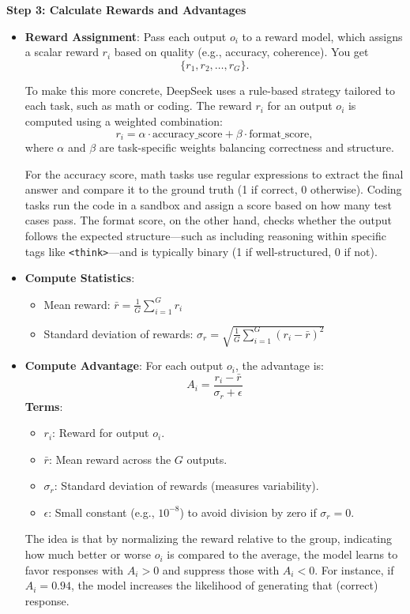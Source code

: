 \documentclass{article}
\begin{document}
\noindent\textbf{Step 3: Calculate Rewards and Advantages}
\begin{itemize}
    \item \textbf{Reward Assignment}: Pass each output \( o_i \) to a reward model, which assigns a scalar reward \( r_i \) based on quality (e.g., accuracy, coherence). You get 
\[
\{r_1, r_2, \dots, r_G\}.
\]


To make this more concrete, DeepSeek uses a rule-based strategy tailored to each task, such as math or coding. The reward \( r_i \) for an output \( o_i \) is computed using a weighted combination:
\[
r_i = \alpha \cdot \text{accuracy\_score} + \beta \cdot \text{format\_score},
\]
where \( \alpha \) and \( \beta \) are task-specific weights balancing correctness and structure.

For the accuracy score, math tasks use regular expressions to extract the final answer and compare it to the ground truth (1 if correct, 0 otherwise). Coding tasks run the code in a sandbox and assign a score based on how many test cases pass. The format score, on the other hand, checks whether the output follows the expected structure—such as including reasoning within specific tags like \texttt{<think>}—and is typically binary (1 if well-structured, 0 if not).
    \item \textbf{Compute Statistics}:
    \begin{itemize}
        \item Mean reward: \( \bar{r} = \frac{1}{G} \sum_{i=1}^{G} r_i \)
        \item Standard deviation of rewards: \( \sigma_r = \sqrt{\frac{1}{G} \sum_{i=1}^{G} (r_i - \bar{r})^2} \)
    \end{itemize}
    \item \textbf{Compute Advantage}: For each output \( o_i \), the advantage is:
\[
A_i = \frac{r_i - \bar{r}}{\sigma_r + \epsilon}
\]
\textbf{Terms}:
\begin{itemize}
    \item \( r_i \): Reward for output \( o_i \).
    \item \( \bar{r} \): Mean reward across the \( G \) outputs.
    \item \( \sigma_r \): Standard deviation of rewards (measures variability).
    \item \( \epsilon \): Small constant (e.g., \( 10^{-8} \)) to avoid division by zero if \( \sigma_r = 0 \).
\end{itemize}
The idea is that by normalizing the reward relative to the group, indicating how much better or worse \( o_i \) is compared to the average, the model learns to favor responses with \( A_i > 0 \) and suppress those with \( A_i < 0 \). For instance, if \( A_i = 0.94 \), the model increases the likelihood of generating that (correct) response.\\[1mm]

\end{itemize}
\end{document}
